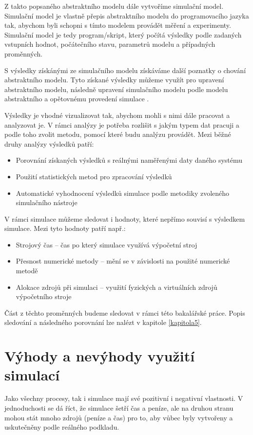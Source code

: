 Z takto popsaného abstraktního modelu dále vytvoříme simulační model. Simulační model je vlastně přepis abstraktního modelu do programovacího jazyka tak, abychom byli schopni s tímto modelem provádět měření a experimenty. Simulační model je tedy program/skript, který počítá výsledky podle zadaných vstupních hodnot, počátečního stavu, parametrů modelu a případných proměnných.

S výsledky získánými ze simulačního modelu získáváme další poznatky o chování abstraktního modelu. Tyto získané výsledky můžeme využít pro upravení abstraktního modelu, následně upravení simulačního modelu podle modelu abstraktního a opětovnému provedení simulace \cite{IMS-skripta}.

Výsledky je vhodné vizualizovat tak, abychom mohli s nimi dále pracovat a analyzovat je. V rámci analýzy je potřeba rozlišit s jakým typem dat pracuji a podle toho zvolit metodu, pomocí které budu analýzu provádět. Mezi běžné druhy analýzy výsledků patří:
\begin{itemize}
    \item Porovnání získaných výsledků s reálnými naměřenými daty daného systému
    \item Použití statistických metod pro zpracování výsledků
    \item Automatické vyhodnocení výsledků simulace podle metodiky zvoleného simulačního nástroje
\end{itemize}

V rámci simulace můžeme sledovat i hodnoty, které nepřímo souvisí s výsledkem simulace. Mezi tyto hodnoty patří např.:
\begin{itemize}
    \item Strojový čas -- čas po který simulace využívá výpočetní stroj
    \item Přesnost numerické metody -- mění se v závislosti na použité numerické metodě
    \item Alokace zdrojů při simulaci -- využití fyzických a virtuálních zdrojů výpočetního stroje
\end{itemize}

Část z těchto proměnných budeme sledovat v rámci této bakalářské práce. Popis sledování a následného porovnání lze nalézt v kapitole \ref{kapitola5}.

\section{Výhody a nevýhody využití simulací}

Jako všechny procesy, tak i simulace mají své pozitivní i negativní vlastnosti. V jednoduchosti se dá říct, že simulace šetří čas a peníze, ale na druhou stranu mohou stát mnoho zdrojů (peníze a čas) pro to, aby vůbec byly vytvořeny a uskutečněny podle reálného podkladu.

